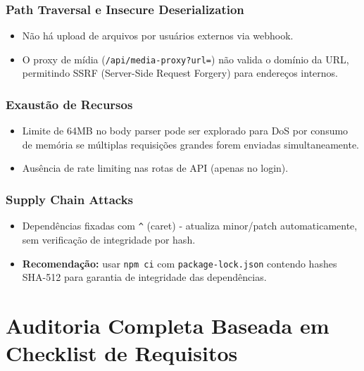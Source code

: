 \documentclass[11pt, a4paper]{article}
\begin{document}
\subsubsection{Path Traversal e Insecure Deserialization}
\begin{itemize}
  \item Não há upload de arquivos por usuários externos via webhook.
  \item O proxy de mídia (\texttt{/api/media-proxy?url=}) não valida o domínio da URL, permitindo SSRF (Server-Side Request Forgery) para endereços internos.
\end{itemize}

\subsubsection{Exaustão de Recursos}
\begin{itemize}
  \item Limite de 64MB no body parser pode ser explorado para DoS por consumo de memória se múltiplas requisições grandes forem enviadas simultaneamente.
  \item Ausência de rate limiting nas rotas de API (apenas no login).
\end{itemize}

\subsubsection{Supply Chain Attacks}
\begin{itemize}
  \item Dependências fixadas com \texttt{\^} (caret) - atualiza minor/patch automaticamente, sem verificação de integridade por hash.
  \item \textbf{Recomendação:} usar \texttt{npm ci} com \texttt{package-lock.json} contendo hashes SHA-512 para garantia de integridade das dependências.
\end{itemize}

\section{Auditoria Completa Baseada em Checklist de Requisitos}
\end{document}
